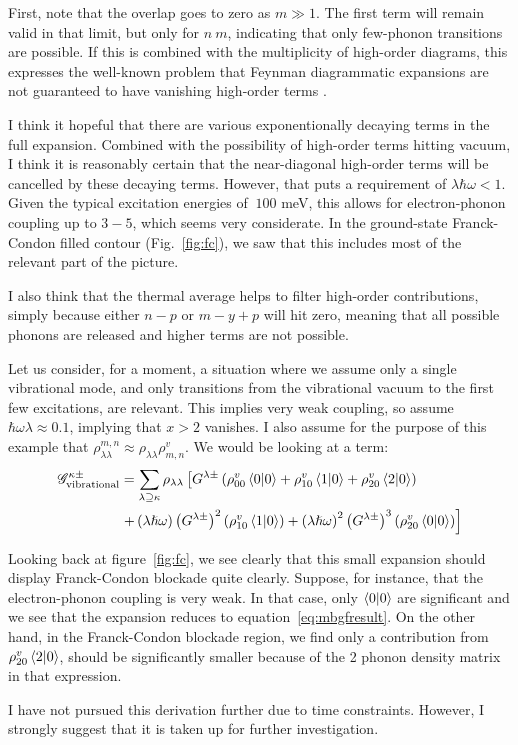 First, note that the overlap goes to zero as $m\gg 1$. The first term will remain valid in that limit, but only for $n~m$, indicating that only few-phonon transitions are possible. If this is combined with the multiplicity of high-order diagrams, this expresses the well-known problem that Feynman diagrammatic expansions are not guaranteed to have vanishing high-order terms \cite{mattuck}.

I think it hopeful that there are various exponentionally decaying terms in the full expansion. Combined with the possibility of high-order terms hitting vacuum, I think it is reasonably certain that the near-diagonal high-order terms will be cancelled by these decaying terms. However, that puts a requirement of $ \lambda \hbar \omega < 1$. Given the typical excitation energies of $~100$ meV, this allows for electron-phonon coupling up to $3-5$, which seems very considerate. In the ground-state Franck-Condon filled contour (Fig.~\ref{fig:fc}), we saw that this includes most of the relevant part of the picture.

I also think that the thermal average helps to filter high-order contributions, simply because either $n-p$ or $m-y+p$ will hit zero, meaning that all possible phonons are released and higher terms are not possible. 

Let us consider, for a moment, a situation where we assume only a single vibrational mode, and only transitions from the vibrational vacuum to the first few excitations, are relevant. This implies very weak coupling, so assume $\hbar \omega \lambda \approx 0.1$, implying that $x>2$ vanishes. I also assume for the purpose of this example that $\rho^{m,n}_{\lambda\lambda} \approx \rho_{\lambda\lambda} \rho^v_{m,n}$. We would be looking at a term:
\begin{align*}
\mathscr{G}^{\kappa\pm}_\text{vibrational} &= \sum_{\lambda\supseteq \kappa} \rho_{\lambda \lambda} \left[ G^{\lambda\pm} \left( \rho_{00}^v \braket{0|0} + \rho_{10}^v \braket{1|0} + \rho_{20}^v\braket{2|0}\right) \right. \\ &\left.+ \left(\lambda\hslash\omega\right)\left(G^{\lambda\pm}\right)^2 \left(\rho_{10}^v \braket{1|0}\right) + \left(\lambda\hslash\omega\right)^2 \left(G^{\lambda\pm}\right)^3 \left( \rho_{20}^v \braket{0|0}\right) \right]
\end{align*}

Looking back at figure~\ref{fig:fc}, we see clearly that this small expansion should display Franck-Condon blockade quite clearly. Suppose, for instance, that the electron-phonon coupling is very weak. In that case, only $\braket{0|0}$ are significant and we see that the expansion reduces to equation~\ref{eq:mbgfresult}. On the other hand, in the Franck-Condon blockade region, we find only a contribution from $\rho^v_{20} \braket{2|0}$, should be significantly smaller because of the 2 phonon density matrix in that expression.

I have not pursued this derivation further due to time constraints. However, I strongly suggest that it is taken up for further investigation.


\label{sec:phononicdiscussion}

